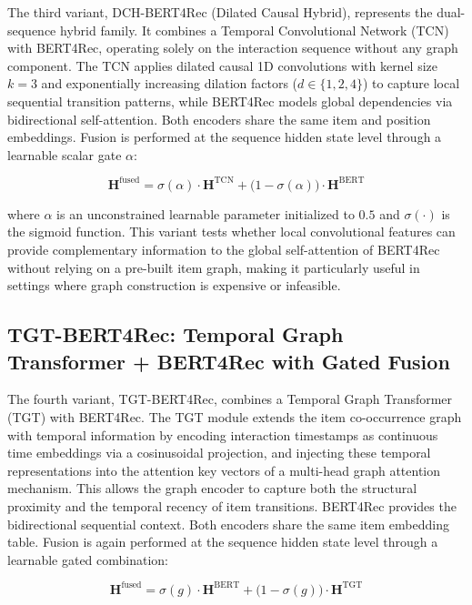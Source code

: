 \documentclass[12pt,a4paper]{report}
\begin{document}
The third variant, DCH-BERT4Rec (Dilated Causal Hybrid), represents the
dual-sequence hybrid family. It combines a Temporal Convolutional Network
(TCN) with BERT4Rec, operating solely on the interaction sequence without any
graph component. The TCN applies dilated causal 1D convolutions with kernel
size \(k = 3\) and exponentially increasing dilation factors (\(d \in \{1, 2,
4\}\)) to capture local sequential transition patterns, while BERT4Rec models
global dependencies via bidirectional self-attention. Both encoders share the
same item and position embeddings. Fusion is performed at the sequence hidden
state level through a learnable scalar gate \(\alpha\):

\begin{equation}
    \mathbf{H}^{\text{fused}} = \sigma(\alpha) \cdot \mathbf{H}^{\text{TCN}}
    + \bigl(1 - \sigma(\alpha)\bigr) \cdot \mathbf{H}^{\text{BERT}}
    \label{eq:fusion_tcn}
\end{equation}

\noindent where \(\alpha\) is an unconstrained learnable parameter initialized
to \(0.5\) and \(\sigma(\cdot)\) is the sigmoid function. This variant tests
whether local convolutional features can provide complementary information to
the global self-attention of BERT4Rec without relying on a pre-built item
graph, making it particularly useful in settings where graph construction is
expensive or infeasible.

\subsection{TGT-BERT4Rec: Temporal Graph Transformer + BERT4Rec with Gated Fusion}

The fourth variant, TGT-BERT4Rec, combines a Temporal Graph Transformer (TGT)
with BERT4Rec. The TGT module extends the item co-occurrence graph with
temporal information by encoding interaction timestamps as continuous time
embeddings via a cosinusoidal projection, and injecting these temporal
representations into the attention key vectors of a multi-head graph attention
mechanism. This allows the graph encoder to capture both the structural
proximity and the temporal recency of item transitions. BERT4Rec provides the
bidirectional sequential context. Both encoders share the same item embedding
table. Fusion is again performed at the sequence hidden state level through
a learnable gated combination:

\begin{equation}
    \mathbf{H}^{\text{fused}} = \sigma(g) \cdot \mathbf{H}^{\text{BERT}}
    + \bigl(1 - \sigma(g)\bigr) \cdot \mathbf{H}^{\text{TGT}}
    \label{eq:fusion_tgt}
\end{equation}
\end{document}
